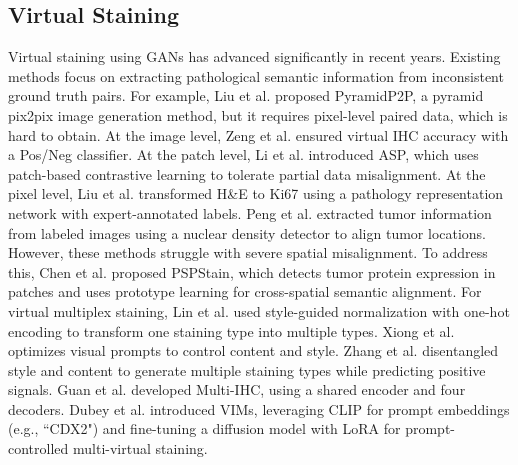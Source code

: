 \documentclass[journal,twoside,web]{ieeecolor}
\newcommand{\revision}[1]{\textcolor{revisioncolor}{#1}}  %
\renewcommand{\revision}[1]{#1}%
\begin{document}
\subsection{Virtual Staining}
Virtual staining using GANs has advanced significantly in recent years. Existing methods focus on extracting pathological semantic information from inconsistent ground truth pairs. For example, Liu et al. \cite{liu2022bci} proposed PyramidP2P, a pyramid pix2pix image generation method, but it requires pixel-level paired data, which is hard to obtain. At the image level, Zeng et al. \cite{zeng2022semi} 
 ensured virtual IHC accuracy with a Pos/Neg classifier. At the patch level, Li et al. \cite{li2023adaptive} introduced ASP, which uses patch-based contrastive learning to tolerate partial data misalignment. At the pixel level, Liu et al. \cite{liu2021unpaired} transformed H\&E to Ki67 using a pathology representation network with expert-annotated labels. Peng et al. \cite{peng2024advancing} extracted tumor information from labeled images using a nuclear density detector to align tumor locations. However, these methods struggle with severe spatial misalignment. To address this, Chen et al. \cite{chen2024pathological} proposed PSPStain, which detects tumor protein expression in patches and uses prototype learning for cross-spatial semantic alignment.
 For virtual multiplex staining, Lin et al. \cite{lin2022unpaired} used style-guided normalization with one-hot encoding to transform one staining type into multiple types. Xiong et al. \cite{xiong2025unpaired} optimizes visual prompts to control content and style. Zhang et al. \cite{zhang2022mvfstain} disentangled style and content to generate multiple staining types while predicting positive signals. Guan et al. \cite{guan2025correlated} developed Multi-IHC, using a shared encoder and four decoders. 
 Dubey et al. \cite{dubey2024vims} introduced VIMs, leveraging CLIP \cite{radford2021learning} for prompt embeddings (e.g., \revision{``CDX2"}) and fine-tuning a diffusion model with LoRA for prompt-controlled multi-virtual staining.




\end{document}
